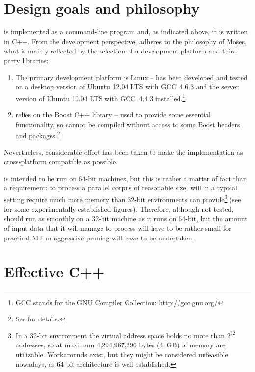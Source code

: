 \section{Design goals and philosophy}

\Eppex{} is implemented as a command-line program and, as indicated above, it is written in C++.
From the development perspective, \eppex{} adheres to the philosophy of Moses, what is mainly
reflected by the selection of a development platform and third party libraries:
\begin{enumerate}
  \item The primary development platform is Linux --
  \eppex{} has been developed and tested on a desktop version of Ubuntu 12.04 LTS with GCC~4.6.3 and
  the server version of Ubuntu 10.04 LTS with GCC~4.4.3 installed.\footnote{GCC stands for the GNU Compiler Collection: \url{http://gcc.gnu.org/}}
  \item \Eppex{} relies on the Boost C++ library -- used to provide
  some essential functionality, so \eppex{} cannot be compiled without access to some Boost
  headers and packages.\footnote{See  for details.}
\end{enumerate}
Nevertheless, considerable effort has been taken to make the implementation as cross-platform
compatible as possible.

\Eppex{} is intended to be run on 64-bit machines, but this is rather a matter of fact than
a requirement: to process a parallel corpus of reasonable size, \eppex{} will in a typical
setting require much more memory than 32-bit environments can provide\footnote{In a 32-bit
environment the virtual address space holds no more than $2^{32}$ addresses, so at maximum
4,294,967,296 bytes (4~GB) of memory are utilizable. Workarounds exist, but they might be
considered unfeasible nowadays, as 64-bit architecture is well established.} (see
 for some experimentally established figures).
Therefore, although not tested, \eppex{} should run as smoothly on a 32-bit machine as it runs
on 64-bit, but the amount of input data that it will manage to process will have to be rather
small for practical MT or aggressive pruning will have to be undertaken.

\section{Effective C++}

